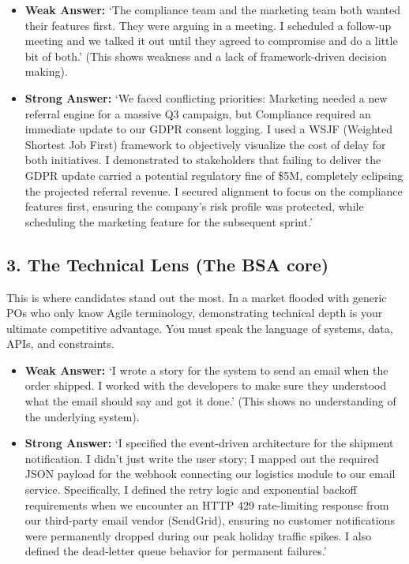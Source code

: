 \documentclass[
  11pt,
  openany,
  oneside]{book}
\providecommand{\tightlist}{%
  \setlength{\itemsep}{0pt}\setlength{\parskip}{0pt}}
\begin{document}
\begin{itemize}
\tightlist
\item
  \textbf{Weak Answer:} `The compliance team and the marketing team both
  wanted their features first. They were arguing in a meeting. I
  scheduled a follow-up meeting and we talked it out until they agreed
  to compromise and do a little bit of both.' (This shows weakness and a
  lack of framework-driven decision making).
\item
  \textbf{Strong Answer:} `We faced conflicting priorities: Marketing
  needed a new referral engine for a massive Q3 campaign, but Compliance
  required an immediate update to our GDPR consent logging. I used a
  WSJF (Weighted Shortest Job First) framework to objectively visualize
  the cost of delay for both initiatives. I demonstrated to stakeholders
  that failing to deliver the GDPR update carried a potential regulatory
  fine of \$5M, completely eclipsing the projected referral revenue. I
  secured alignment to focus on the compliance features first, ensuring
  the company's risk profile was protected, while scheduling the
  marketing feature for the subsequent sprint.'
\end{itemize}

\subsection{3. The Technical Lens (The BSA
core)}\label{the-technical-lens-the-bsa-core}

This is where candidates stand out the most. In a market flooded with
generic POs who only know Agile terminology, demonstrating technical
depth is your ultimate competitive advantage. You must speak the
language of systems, data, APIs, and constraints.

\begin{itemize}
\tightlist
\item
  \textbf{Weak Answer:} `I wrote a story for the system to send an email
  when the order shipped. I worked with the developers to make sure they
  understood what the email should say and got it done.' (This shows no
  understanding of the underlying system).
\item
  \textbf{Strong Answer:} `I specified the event-driven architecture for
  the shipment notification. I didn't just write the user story; I
  mapped out the required JSON payload for the webhook connecting our
  logistics module to our email service. Specifically, I defined the
  retry logic and exponential backoff requirements when we encounter an
  HTTP 429 rate-limiting response from our third-party email vendor
  (SendGrid), ensuring no customer notifications were permanently
  dropped during our peak holiday traffic spikes. I also defined the
  dead-letter queue behavior for permanent failures.'
\end{itemize}
\end{document}
